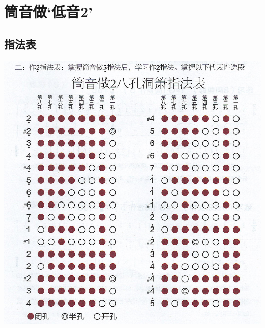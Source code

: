 \documentclass[cn,pad,chinese,chinesefont=nofont]{elegantbook}
\begin{document}
\chapter{筒音做‘低音2’}
\section{指法表}
\includegraphics[width=\textwidth]{dongxiao/Scan 4.1.jpeg}
\end{document}
